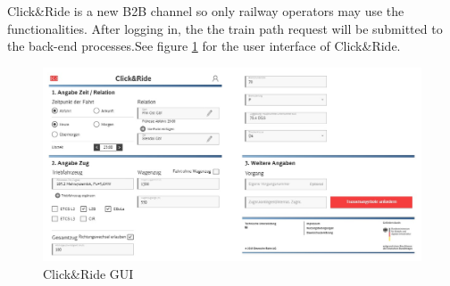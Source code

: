 Click\&Ride is a new B2B channel so only railway operators may use the functionalities. After logging in, the the train path request will be submitted to the back-end processes.See figure \ref{fig:CnR_request} for the user interface of Click\&Ride.
\begin{figure}[htb]
	\centering
	\includegraphics[width=\textwidth]{Bilder/request.jpg}
	\caption{Click\&Ride GUI}
	\label{fig:CnR_request}
\end{figure}

